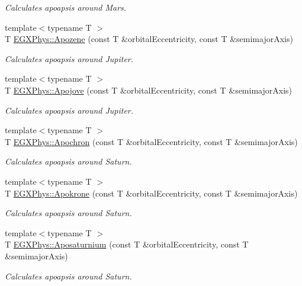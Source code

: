 \begin{DoxyCompactItemize}
\begin{DoxyCompactList}\small\item\em Calculates apoapsis around Mars. \end{DoxyCompactList}\item 
{\footnotesize template$<$typename T $>$ }\\T \hyperlink{group___astrophysics_ga44d3dd8d8b350d053b25b7b1f1e15534}{E\+G\+X\+Phys\+::\+Apozene} (const T \&orbital\+Eccentricity, const T \&semimajor\+Axis)
\begin{DoxyCompactList}\small\item\em Calculates apoapsis around Jupiter. \end{DoxyCompactList}\item 
{\footnotesize template$<$typename T $>$ }\\T \hyperlink{group___astrophysics_ga5a45d0a873514113aaa0adc95aefbbde}{E\+G\+X\+Phys\+::\+Apojove} (const T \&orbital\+Eccentricity, const T \&semimajor\+Axis)
\begin{DoxyCompactList}\small\item\em Calculates apoapsis around Jupiter. \end{DoxyCompactList}\item 
{\footnotesize template$<$typename T $>$ }\\T \hyperlink{group___astrophysics_gae4ea146039e6f32022321f0998e715e8}{E\+G\+X\+Phys\+::\+Apochron} (const T \&orbital\+Eccentricity, const T \&semimajor\+Axis)
\begin{DoxyCompactList}\small\item\em Calculates apoapsis around Saturn. \end{DoxyCompactList}\item 
{\footnotesize template$<$typename T $>$ }\\T \hyperlink{group___astrophysics_ga98557a8d49aa129c29e652c4758334d1}{E\+G\+X\+Phys\+::\+Apokrone} (const T \&orbital\+Eccentricity, const T \&semimajor\+Axis)
\begin{DoxyCompactList}\small\item\em Calculates apoapsis around Saturn. \end{DoxyCompactList}\item 
{\footnotesize template$<$typename T $>$ }\\T \hyperlink{group___astrophysics_gac157adc20a88c8616e4822eb819f9016}{E\+G\+X\+Phys\+::\+Aposaturnium} (const T \&orbital\+Eccentricity, const T \&semimajor\+Axis)
\begin{DoxyCompactList}\small\item\em Calculates apoapsis around Saturn. \end{DoxyCompactList}\item 

\end{DoxyCompactItemize}
